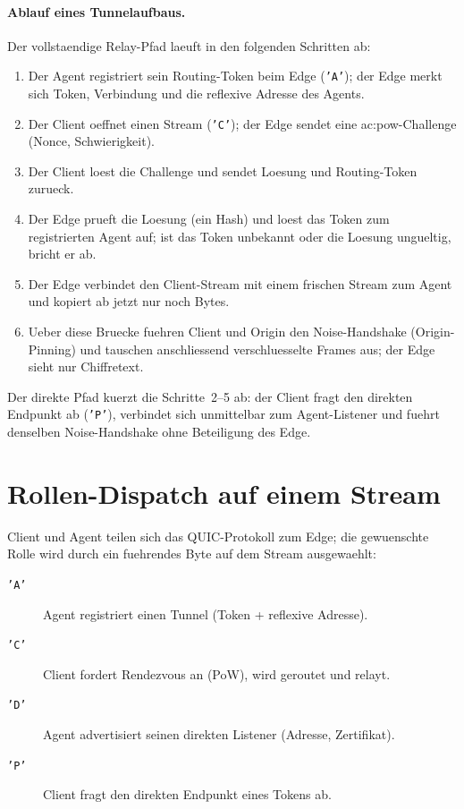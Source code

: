 \paragraph{Ablauf eines Tunnelaufbaus.} Der vollstaendige Relay-Pfad laeuft in
den folgenden Schritten ab:
\begin{enumerate}
  \item Der Agent registriert sein Routing-Token beim Edge (\texttt{'A'}); der
    Edge merkt sich Token, Verbindung und die reflexive Adresse des Agents.
  \item Der Client oeffnet einen Stream (\texttt{'C'}); der Edge sendet eine
    \gls{ac:pow}-Challenge (Nonce, Schwierigkeit).
  \item Der Client loest die Challenge und sendet Loesung und Routing-Token
    zurueck.
  \item Der Edge prueft die Loesung (ein Hash) und loest das Token zum
    registrierten Agent auf; ist das Token unbekannt oder die Loesung ungueltig,
    bricht er ab.
  \item Der Edge verbindet den Client-Stream mit einem frischen Stream zum Agent
    und kopiert ab jetzt nur noch Bytes.
  \item Ueber diese Bruecke fuehren Client und Origin den Noise-Handshake
    (Origin-Pinning) und tauschen anschliessend verschluesselte Frames aus; der
    Edge sieht nur Chiffretext.
\end{enumerate}
Der direkte Pfad kuerzt die Schritte~2--5 ab: der Client fragt den direkten
Endpunkt ab (\texttt{'P'}), verbindet sich unmittelbar zum Agent-Listener und
fuehrt denselben Noise-Handshake ohne Beteiligung des Edge.

\section{Rollen-Dispatch auf einem Stream}
\label{sec:arch-dispatch}

Client und Agent teilen sich das QUIC-Protokoll zum Edge; die gewuenschte Rolle
wird durch ein fuehrendes Byte auf dem Stream ausgewaehlt:

\begin{description}
  \item[\texttt{'A'}] Agent registriert einen Tunnel (Token + reflexive Adresse).
  \item[\texttt{'C'}] Client fordert Rendezvous an (PoW), wird geroutet und
    relayt.
  \item[\texttt{'D'}] Agent advertisiert seinen direkten Listener (Adresse,
    Zertifikat).
  \item[\texttt{'P'}] Client fragt den direkten Endpunkt eines Tokens ab.
\end{description}

